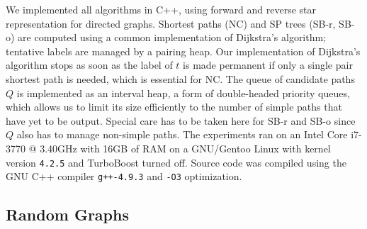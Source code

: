 \documentclass[runningheads,a4paper]{llncs}
\begin{document}
We implemented all algorithms in C++, using forward and reverse star representation for directed graphs.
Shortest paths (NC) and SP trees (SB-r, SB-o) are computed using a common implementation of Dijkstra's algorithm; tentative labels are managed by a pairing heap.
Our implementation of Dijkstra's algorithm stops as soon as the label of $t$ is made permanent if only a single pair shortest path is needed, which is essential for NC.
The queue of candidate paths $Q$ is implemented as an interval heap, a form of double-headed priority queues, which allows us to limit its size efficiently to the number of simple paths that have yet to be output.
Special care has to be taken here for SB-r and SB-o since $Q$ also has to manage non-simple paths.
The experiments ran on an Intel Core i7-3770 @ 3.40GHz with 16GB of RAM on a GNU/Gentoo Linux with kernel version \texttt{4.2.5} and TurboBoost turned off.
Source code was compiled using the GNU C++ compiler \texttt{g++-4.9.3} and \texttt{-O3} optimization.

\subsection{Random Graphs}
\label{sec:random-graphs}
\end{document}
